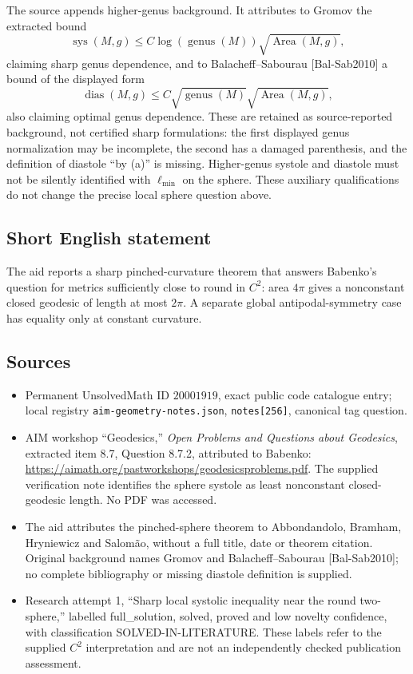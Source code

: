 \documentclass[11pt]{article}
\begin{document}
The source appends higher-genus background. It attributes to Gromov the extracted bound
\[
 \operatorname{sys}(M,g)\leq C\log(\operatorname{genus}(M))
          \sqrt{\operatorname{Area}(M,g)},
\]
claiming sharp genus dependence, and to Balacheff--Sabourau [Bal-Sab2010] a bound of the displayed form
\[
 \operatorname{dias}(M,g)\leq C\sqrt{\operatorname{genus}(M)}
          \sqrt{\operatorname{Area}(M,g)},
\]
also claiming optimal genus dependence. These are retained as source-reported background, not certified sharp formulations: the first displayed genus normalization may be incomplete, the second has a damaged parenthesis, and the definition of diastole ``by (a)'' is missing. Higher-genus systole and diastole must not be silently identified with \(\ell_{\min}\) on the sphere. These auxiliary qualifications do not change the precise local sphere question above.
\subsection{Short English statement}
The aid reports a sharp pinched-curvature theorem that answers Babenko's question for metrics sufficiently close to round in \(C^2\): area \(4\pi\) gives a nonconstant closed geodesic of length at most \(2\pi\). A separate global antipodal-symmetry case has equality only at constant curvature.
\subsection{Sources}
\begin{itemize}
\item Permanent UnsolvedMath ID \(20001919\), exact public code catalogue entry; local registry \texttt{aim-geometry-notes.json}, \texttt{notes[256]}, canonical tag question.
\item AIM workshop ``Geodesics,'' \emph{Open Problems and Questions about Geodesics}, extracted item 8.7, Question 8.7.2, attributed to Babenko: \url{https://aimath.org/pastworkshops/geodesicsproblems.pdf}. The supplied verification note identifies the sphere systole as least nonconstant closed-geodesic length. No PDF was accessed.
\item The aid attributes the pinched-sphere theorem to Abbondandolo, Bramham, Hryniewicz and Salomão, without a full title, date or theorem citation. Original background names Gromov and Balacheff--Sabourau [Bal-Sab2010]; no complete bibliography or missing diastole definition is supplied.
\item Research attempt 1, ``Sharp local systolic inequality near the round two-sphere,'' labelled full\_solution, solved, proved and low novelty confidence, with classification SOLVED-IN-LITERATURE. These labels refer to the supplied \(C^2\) interpretation and are not an independently checked publication assessment.
\end{itemize}
\end{document}
